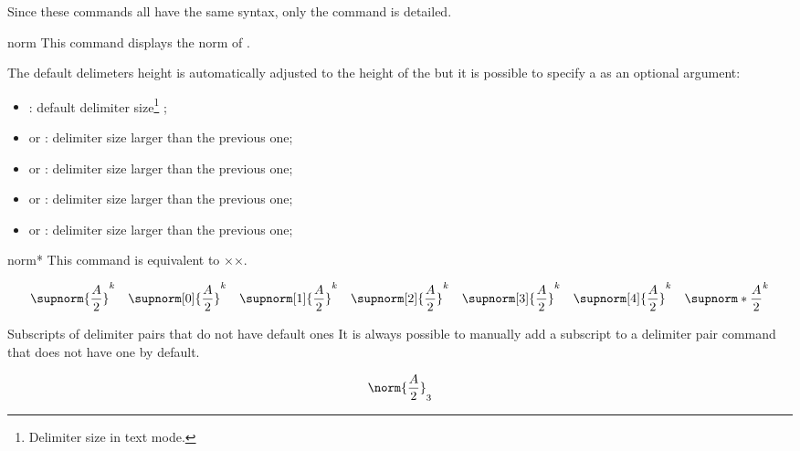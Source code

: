 \documentclass[english,nolocaltoc]{nwejmart}
\newtheorem[style=definition]{fact}
\newtheorem[title-plural=Criteria]{criterion}
\newtheorem[title=random experiment]{rexp}
\begin{document}
Since these commands all have the same syntax, only the
 command  is detailed.

\begin{docCommand*}{norm}{}
  This command displays the norm of .

  The default delimeters height is automatically adjusted to the
  height of the  but it is possible to specify a
   as an optional argument:
  \begin{itemize}
  \item {}: default  delimiter size\footnote{Delimiter size in text mode.} ;
  \item {} or : delimiter size larger
    than the previous one;
  \item {} or : delimiter size larger
    than the previous one;
  \item {} or : delimiter size larger
    than the previous one;
  \item {} or : delimiter size larger
    than the previous one;
  \end{itemize}
\end{docCommand*}

\begin{docCommand}{norm*}{}
  This command is equivalent to ××.
\end{docCommand}

\begin{bodycode}
\begin{equation}
\supnorm{\frac{A}{2}}^k    \quad
\supnorm[0]{\frac{A}{2}}^k \quad
\supnorm[1]{\frac{A}{2}}^k \quad
\supnorm[2]{\frac{A}{2}}^k \quad
\supnorm[3]{\frac{A}{2}}^k \quad
\supnorm[4]{\frac{A}{2}}^k \quad
\supnorm*{\frac{A}{2}}^k
\end{equation}
\end{bodycode}

\begin{dbremark}{Subscripts of delimiter pairs that do not have default ones}{}
  It is always possible to manually add a subscript to a delimiter
  pair command that does not have one by default. 
\begin{bodycode}
\begin{equation}
\norm{\frac{A}{2}}_3
\end{equation}
\end{bodycode}
\end{dbremark}
\end{document}
